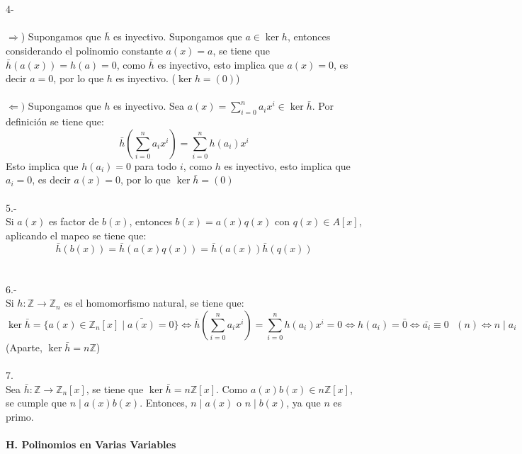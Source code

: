 \documentclass{article}
\begin{document}
\\
\\
4- 
\\
\\
$\Longrightarrow$) Supongamos que $\bar{h}$ es inyectivo. Supongamos que $a \in \ker h$, entonces considerando el polinomio constante $a(x)=a$, se tiene que $\bar{h}(a(x))=h(a)=0$, como $\bar{h}$ es inyectivo, esto implica que $a(x)=0$, es decir $a = 0$, por lo que $h$ es inyectivo. ($\ker h = (0)$)
\\
\\
$\Longleftarrow)$ Supongamos que $h$ es inyectivo. Sea $a(x)=\sum_{i=0}^{n}a_{i}x^{i} \in \ker \bar{h}$. Por definición se tiene que:
\begin{equation*}
    \bar{h}\left( \sum_{i=0}^{n}a_{i}x^{i}\right) = \sum_{i=0}^{n}h(a_{i})x^{i}
\end{equation*}
Esto implica que $h(a_{i})=0$ para todo $i$, como $h$ es inyectivo, esto implica que $a_{i}=0$, es decir $a(x)=0$, por lo que $\ker \bar{h}=(0)$
\\
\\
5.-
\\
Si $a(x)$ es factor de $b(x)$, entonces $b(x)=a(x)q(x)$ con $q(x) \in A[x]$, aplicando el mapeo se tiene que:
\begin{equation*}
    \bar{h}(b(x))=\bar{h}(a(x)q(x))=\bar{h}(a(x))\bar{h}(q(x))
\end{equation*}
\\
\\
6.-
\\
Si $h: \mathbb{Z} \to \mathbb{Z}_{n}$ es el homomorfismo natural, se tiene que:
\begin{equation*}
    \ker \bar{h} = \{ a(x) \in \mathbb{Z}_n[x] \mid \bar{a(x)} = 0 \} \Longleftrightarrow \bar{h}\left( \sum_{i=0}^{n} a_{i}x^{i} \right) = \sum_{i=0}^{n} h(a_{i})x^{i}=0 \Longleftrightarrow h(a_{i})=\bar{0} \Longleftrightarrow \bar{a_{i}} \equiv 0 \text{ } (n) \Longleftrightarrow n \mid a_{i}
\end{equation*}
(Aparte, $\ker \bar{h}=n \mathbb{Z}$)
\\
\\
7.
\\
Sea \( \bar{h}: \mathbb{Z} \to \mathbb{Z}_n[x] \), se tiene que \( \ker \bar{h} = n \mathbb{Z}[x] \). Como \( a(x)b(x) \in n \mathbb{Z}[x] \), se cumple que \( n \mid a(x)b(x) \). Entonces, \( n \mid a(x) \) o \( n \mid b(x) \), ya que $n$ es primo.
\\
\\
\textbf{H. Polinomios en Varias Variables}
\end{document}

